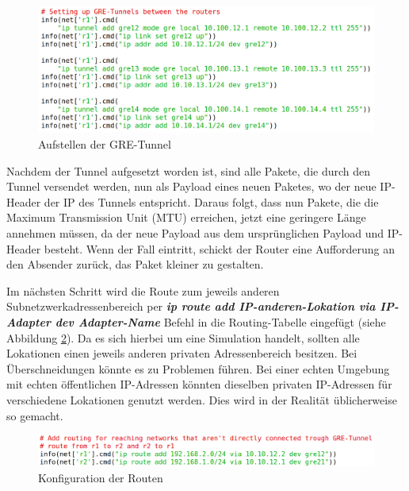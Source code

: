 \documentclass[fontsize=12pt,paper=a4,open=any,parskip=half,
  twoside=false,toc=listof,toc=bibliography,fleqn,leqno,
  captions=nooneline,captions=tableabove,british]{scrbook}
\begin{document}
\begin{figure}[H]
 \centering
 \includegraphics[width=1.0\textwidth]{Bilder/gre}
 \captionsetup{justification=centering,margin=2cm}
 \caption{Aufstellen der GRE-Tunnel}
 \label{gre}
\end{figure}

Nachdem der Tunnel aufgesetzt worden ist, sind alle Pakete, die durch den Tunnel versendet werden, nun als Payload eines neuen Paketes, wo der neue IP-Header der IP des Tunnels entspricht. Daraus folgt, dass nun Pakete, die die Maximum Transmission Unit (MTU) erreichen, jetzt eine geringere Länge annehmen müssen, da der neue Payload aus dem ursprünglichen Payload und IP-Header besteht. Wenn der Fall eintritt, schickt der Router eine Aufforderung an den Absender zurück, das Paket kleiner zu gestalten.

Im nächsten Schritt wird die Route zum jeweils anderen Subnetzwerkadressenbereich per \textit{\textbf{ip route add IP-anderen-Lokation via IP-Adapter dev Adapter-Name}} Befehl in die Routing-Tabelle eingefügt (siehe Abbildung \ref{route}). Da es sich hierbei um eine Simulation handelt, sollten alle Lokationen einen jeweils anderen privaten Adressenbereich besitzen. Bei Überschneidungen könnte es zu Problemen führen. Bei einer echten Umgebung mit echten öffentlichen IP-Adressen könnten dieselben privaten IP-Adressen für verschiedene Lokationen genutzt werden. Dies wird in der Realität üblicherweise so gemacht.

\begin{figure}[H]
 \centering
 \includegraphics[width=1.0\textwidth]{Bilder/route}
 \captionsetup{justification=centering,margin=2cm}
 \caption{Konfiguration der Routen}
 \label{route}
\end{figure}
\end{document}

